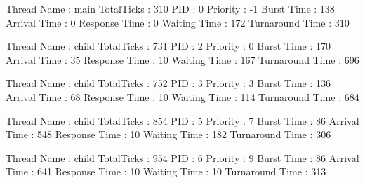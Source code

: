 \documentclass{article}
\begin{document}
\begin{itemize}
Thread Name : main
TotalTicks : 310
PID : 0
Priority : -1
Burst Time : 138
Arrival Time : 0
Response Time : 0
Waiting Time : 172
Turnaround Time : 310

Thread Name : child
TotalTicks : 731
PID : 2
Priority : 0
Burst Time : 170
Arrival Time : 35
Response Time : 10
Waiting Time : 167
Turnaround Time : 696

Thread Name : child
TotalTicks : 752
PID : 3
Priority : 3
Burst Time : 136
Arrival Time : 68
Response Time : 10
Waiting Time : 114
Turnaround Time : 684

Thread Name : child
TotalTicks : 854
PID : 5
Priority : 7
Burst Time : 86
Arrival Time : 548
Response Time : 10
Waiting Time : 182
Turnaround Time : 306

Thread Name : child
TotalTicks : 954
PID : 6
Priority : 9
Burst Time : 86
Arrival Time : 641
Response Time : 10
Waiting Time : 10
Turnaround Time : 313


\end{itemize}
\end{document}
